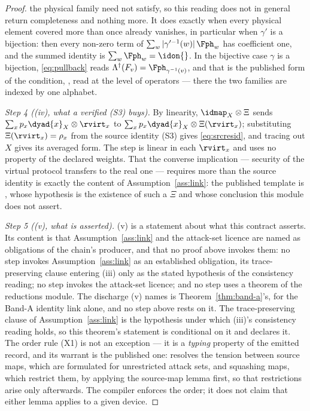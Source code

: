 \begin{proof}
the physical family need not satisfy, so this reading does not in general
return completeness and nothing more. It does exactly when every physical
element covered more than once already vanishes, in particular when $\gamma'$
is a bijection: then every non-zero term of
$\sum_w|\gamma'^{-1}(w)|\,\Fph_w$ has coefficient one, and the summed
identity is $\sum_w\Fph_w=\idon{}$.
In the bijective case $\gamma$ is a bijection,
\eqref{eq:pullback} reads $\Lambda^{\dagger}(F_v)=\Fph_{\gamma^{-1}(v)}$, and
that is the published form of the condition,
\cite[Lemma~9.3, Eq.~(146)]{tupkary2026decoy}, read at the level of operators
--- there the two families are indexed by one alphabet.

\emph{Step 4 ((iv), what a verified (S3) buys).} By linearity,
$\idmap_X\otimes\Xi$ sends $\sum_xp_x\dyad{x}_X\otimes\rvirt_x$ to
$\sum_xp_x\dyad{x}_X\otimes\Xi(\rvirt_x)$; substituting
$\Xi(\rvirt_x)=\rho_x$ from the source identity (S3) gives
\eqref{eq:srcresid}, and tracing out $X$ gives its averaged form. The step is
linear in each $\rvirt_x$ and uses no property of the declared weights. That
the converse implication --- security of the virtual protocol transfers to the
real one --- requires more than the source identity is exactly the content of
Assumption~\ref{ass:link}: the published template is
\cite[Lemma~9.1, Eqs.~(138)--(139)]{tupkary2026decoy}, whose hypothesis is the
existence of such a $\Xi$ and whose conclusion this module does not assert.

\emph{Step 5 ((v), what is asserted).} (v) is a statement about what this
contract asserts. Its content is that Assumption~\ref{ass:link} and the
attack-set licence are named as obligations of the chain's producer, and
that no proof above invokes them: no step invokes Assumption~\ref{ass:link}
as an established obligation, its trace-preserving clause entering (iii) only
as the stated hypothesis of the consistency reading; no step invokes the
attack-set licence; and no step uses a theorem of the reductions
module. The discharge (v) names is Theorem~\ref{thm:band-a}'s, for the
Band-A identity link alone, and no step above rests on it. The
trace-preserving clause of Assumption~\ref{ass:link} is the hypothesis under
which (iii)'s consistency reading holds, so this theorem's statement is
conditional on it and declares it. The order rule (X1) is not an exception --- it is a
\emph{typing} property of the emitted record, and its warrant is the published
one: \cite[Rem.~9.2]{tupkary2026decoy} resolves the tension between source
maps, which are formulated for unrestricted attack sets, and squashing maps,
which restrict them, by applying the source-map lemma first, so that
restrictions arise only afterwards. The compiler enforces the order; it does
not claim that either lemma applies to a given device.


\end{proof}
